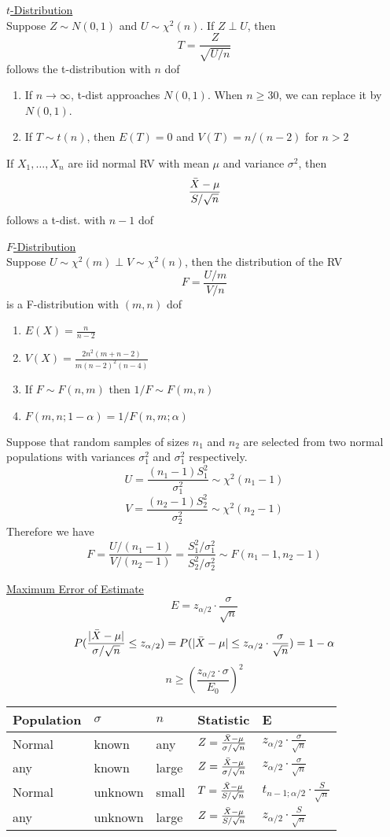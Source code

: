 \documentclass[a4paper,1pt,landscape]{article}
\begin{document}
\begin{multicols}{3}
\underline{$t$-Distribution}\\
Suppose $Z \sim N(0,1)$ and $U\sim \chi^2(n)$. If $Z\perp U$, then
$$T = \frac{Z}{\sqrt{U/n}}$$
follows the t-distribution with $n$ dof
\begin{enumerate}
    \item If $n\rightarrow\infty$, t-dist approaches $N(0,1)$. When $n\geq 30$, we can replace it by $N(0,1)$.
    \item If $T\sim t(n)$, then $E(T) = 0$ and $V(T) = n/(n-2)$ for $n>2$
\end{enumerate}

If $X_1, \ldots,X_n$ are iid normal RV with mean $\mu$ and variance $\sigma^2$, then
$$\frac{\Bar{X}-\mu}{S/\sqrt{n}}$$
follows a t-dist. with $n-1$ dof

\underline{$F$-Distribution}\\
Suppose $U\sim \chi^2(m) \perp V\sim \chi^2(n)$, then the distribution of the RV
$$F = \frac{U/m}{V/n}$$
is a F-distribution with $(m,n)$ dof
\begin{enumerate}
    \item $E(X) = \frac{n}{n-2}$
    \item $V(X) = \frac{2n^2(m+n-2)}{m(n-2)^2(n-4)}$
    \item If $F\sim F(n,m)$ then $1/F \sim F(m,n)$
    \item $F(m,n;1-\alpha) = 1/F(n,m;\alpha)$
\end{enumerate}

Suppose that random samples of sizes $n_1$ and $n_2$ are selected from two normal populations with variances $\sigma_1^2$ and $\sigma_1^2$ respectively.
$$U = \frac{(n_1-1)S_1^2}{\sigma_1^2}\sim \chi^2(n_1-1)$$
$$V = \frac{(n_2-1)S_2^2}{\sigma_2^2}\sim \chi^2(n_2-1)$$
Therefore we have
$$F = \frac{U/(n_1-1)}{V/(n_2-1)} = \frac{S_1^2/\sigma_1^2}{S_2^2/\sigma_2^2}\sim F(n_1-1, n_2-1)$$

\underline{Maximum Error of Estimate}
$$E = z_{\alpha/2}\cdot \frac{\sigma}{\sqrt{n}}$$
$$P(\frac{|\Bar{X}-\mu|}{\sigma/\sqrt{n}} \leq z_{\alpha/2}) = P(|\Bar{X}-\mu| \leq z_{\alpha/2}\cdot \frac{\sigma}{\sqrt{n}}) = 1-\alpha$$
$$n\geq (\frac{z_{\alpha/2}\cdot \sigma}{E_0})^2$$

\begin{tabular}{ | m{1cm} | m{1cm} | m{1cm} | m{1cm} | m{1cm} | } 
  \hline
  Population & $\sigma$ & $n$ & Statistic & E \\ 
  \hline
  Normal & known & any & $Z = \frac{\Bar{X}-\mu}{\sigma/\sqrt{n}}$ & $z_{\alpha/2}\cdot \frac{\sigma}{\sqrt{n}}$ \\ 
  \hline
  any & known & large & $Z = \frac{\Bar{X}-\mu}{\sigma/\sqrt{n}}$ & $z_{\alpha/2}\cdot \frac{\sigma}{\sqrt{n}}$ \\ 
  \hline
    Normal & unknown & small & $T = \frac{\Bar{X}-\mu}{S/\sqrt{n}}$ & $t_{n-1;\alpha/2}\cdot \frac{S}{\sqrt{n}}$ \\ 
    \hline
      any & unknown & large & $Z = \frac{\Bar{X}-\mu}{S/\sqrt{n}}$ & $z_{\alpha/2}\cdot \frac{S}{\sqrt{n}}$ \\ 
      \hline
\end{tabular}


\end{multicols}
\end{document}
